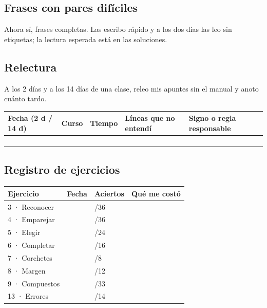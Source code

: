 \documentclass[11pt,a4paper]{article}
\newcounter{ejercicio}
\begin{document}
\subsection*{Frases con pares difíciles}
Ahora sí, frases completas. Las escribo rápido y a los dos días las leo sin
etiquetas; la lectura esperada está en las soluciones.
\begin{apunte}
\end{apunte}

\subsection*{Relectura}
A los 2 días y a los 14 días de una clase, releo mis apuntes sin el manual y
anoto cuánto tardo.
\begin{center}
\begin{tabular}{@{}lp{18mm}p{14mm}>{\raggedright\arraybackslash}p{28mm}p{48mm}@{}}
\toprule Fecha (2 d / 14 d) & Curso & Tiempo & Líneas que no entendí & Signo o regla responsable \\ \midrule
\rule{0pt}{9mm} & & & & \\ \hline
\rule{0pt}{9mm} & & & & \\ \hline
\rule{0pt}{9mm} & & & & \\ \hline
\rule{0pt}{9mm} & & & & \\ \bottomrule
\end{tabular}
\end{center}

\clearpage
\subsection*{Registro de ejercicios}
\begin{center}
\begin{tabular}{@{}p{36mm}p{20mm}p{20mm}p{60mm}@{}}
\toprule Ejercicio & Fecha & Aciertos & Qué me costó \\ \midrule
3 · Reconocer & & \phantom{0}/36 & \\ \hline
4 · Emparejar & & \phantom{0}/36 & \\ \hline
5 · Elegir & & \phantom{0}/24 & \\ \hline
6 · Completar & & \phantom{0}/16 & \\ \hline
7 · Corchetes & & \phantom{0}/8 & \\ \hline
8 · Margen & & \phantom{0}/12 & \\ \hline
9 · Compuestos & & \phantom{0}/33 & \\ \hline
13 · Errores & & \phantom{0}/14 & \\ \bottomrule
\end{tabular}
\end{center}
\end{document}
